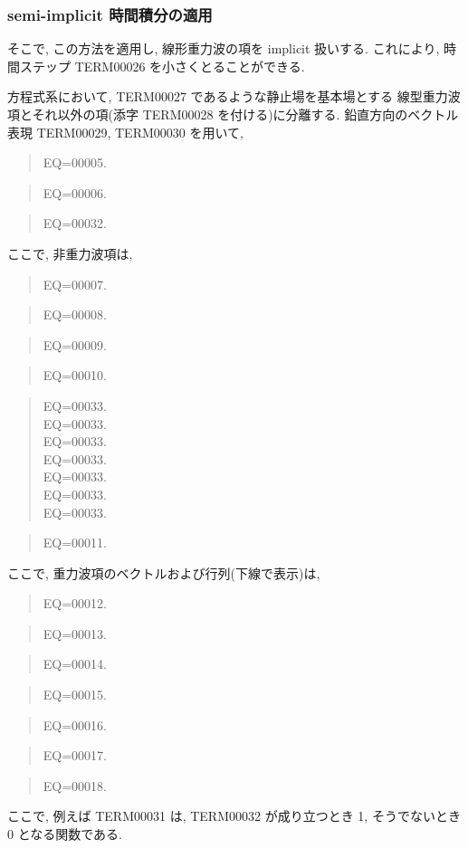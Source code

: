 \subsubsection{semi-implicit 時間積分の適用}

そこで, この方法を適用し, 線形重力波の項を implicit 扱いする.
これにより, 時間ステップ TERM00026 を小さくとることができる.

方程式系において, TERM00027 であるような静止場を基本場とする
線型重力波項とそれ以外の項(添字 TERM00028 を付ける)に分離する.
鉛直方向のベクトル表現
TERM00029, TERM00030 を用いて,
%
\begin{quote}
EQ=00005.
\end{quote}
%
\begin{quote}
EQ=00006.
\end{quote}
%
\begin{quote}
EQ=00032.
\end{quote}

ここで, 非重力波項は,
%
\begin{quote}
EQ=00007.
\label{Z項}
\end{quote}
%
\begin{quote}
EQ=00008.
\end{quote}
%
\begin{quote}
EQ=00009.
\end{quote}
%
\begin{quote}
EQ=00010.
\end{quote}
%
\begin{quote}
\nonumber
EQ=00033.\\
\nonumber
EQ=00033.\\
\nonumber
EQ=00033.\\
\nonumber
EQ=00033.\\
\nonumber
EQ=00033.\\
\nonumber
EQ=00033.\\
EQ=00033.
\end{quote}
\begin{quote}
EQ=00011.
\end{quote}

ここで, 重力波項のベクトルおよび行列(下線で表示)は,
%
\begin{quote}
EQ=00012.
\label{係数C}
\end{quote}
%
\begin{quote}
EQ=00013.
\end{quote}
%
\begin{quote}
EQ=00014.
\end{quote}
%
\begin{quote}
EQ=00015.
\end{quote}
%
\begin{quote}
EQ=00016.
\end{quote}
%
\begin{quote}
EQ=00017.
\end{quote}
%
\begin{quote}
EQ=00018.
\label{係数R}
\end{quote}
%
ここで, 例えば TERM00031 は,
TERM00032 が成り立つとき 1, そうでないとき 0 となる関数である.

